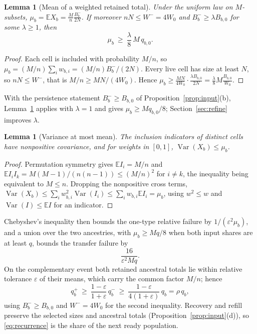 \documentclass[11pt,a4paper]{article}
\theoremstyle{plain}
\newtheorem{lemma}[theorem]{Lemma}
\theoremstyle{definition}
\theoremstyle{remark}
\newcommand{\E}{\mathbb E}
\newcommand{\eps}{\varepsilon}
\newcommand{\Var}{\operatorname{Var}}
\begin{document}
\begin{lemma}[Mean of a weighted retained total]\label{lem:mean}
Under the uniform law on $M$-subsets,
$\mu_b=\E X_b=\frac{M}{n}\frac{B_b^-}{2N}$. If moreover $nN\le W^-=4W_0$ and
$B_b^-\ge\lambda B_{b,0}$ for some $\lambda\ge1$, then
\begin{equation}\label{eq:meanfloor}
\mu_b\ \ge\ \frac{\lambda}{8}\,M\,q_{b,0}.
\end{equation}
\end{lemma}

\begin{proof}
Each cell is included with probability $M/n$, so
$\mu_b=(M/n)\sum_iw_{b,i}=(M/n)B_b^-/(2N)$. Every live cell has size at least
$N$, so $nN\le W^-$, that is $M/n\ge MN/(4W_0)$. Hence
$\mu_b\ge\frac{MN}{4W_0}\cdot\frac{\lambda B_{b,0}}{2N}
=\frac\lambda8 M\frac{B_{b,0}}{W_0}$.
\end{proof}

With the persistence statement $B_b^-\ge B_{b,0}$ of
Proposition~\ref{prop:input}(b), Lemma~\ref{lem:mean} applies with $\lambda=1$
and gives $\mu_b\ge Mq_{b,0}/8$; Section~\ref{sec:refine} improves $\lambda$.

\begin{lemma}[Variance at most mean]\label{lem:var}
The inclusion indicators of distinct cells have nonpositive covariance, and for
weights in $[0,1]$, $\Var(X_b)\le\mu_b$.
\end{lemma}

\begin{proof}
Permutation symmetry gives $\E I_i=M/n$ and
$\E I_iI_k=M(M-1)/(n(n-1))\le(M/n)^2$ for $i\ne k$, the inequality being
equivalent to $M\le n$. Dropping the nonpositive cross terms,
$\Var(X_b)\le\sum_iw_{b,i}^2\Var(I_i)\le\sum_iw_{b,i}\E I_i=\mu_b$, using
$w^2\le w$ and $\Var(I)\le\E I$ for an indicator.
\end{proof}

Chebyshev's inequality then bounds the one-type relative failure by
$1/(\eps^2\mu_b)$, and a union over the two ancestries, with $\mu_b\ge Mq/8$
when both input shares are at least $q$, bounds the transfer failure by
\begin{equation}\label{eq:transferbound}
\frac{16}{\eps^2Mq}.
\end{equation}
On the complementary event both retained ancestral totals lie within relative
tolerance $\eps$ of their means, which carry the common factor $M/n$; hence
\begin{equation}\label{eq:recurrence}
q_b^+\ \ge\ \frac{1-\eps}{1+\eps}\,q_b^-\ \ge\ \frac{1-\eps}{4(1+\eps)}\,q_b
=\rho\,q_b ,
\end{equation}
using $B_b^-\ge B_{b,0}$ and $W^-=4W_0$ for the second inequality. Recovery and
refill preserve the selected sizes and ancestral totals
(Proposition~\ref{prop:input}(d)), so \eqref{eq:recurrence} is the share of the
next ready population.
\end{document}
